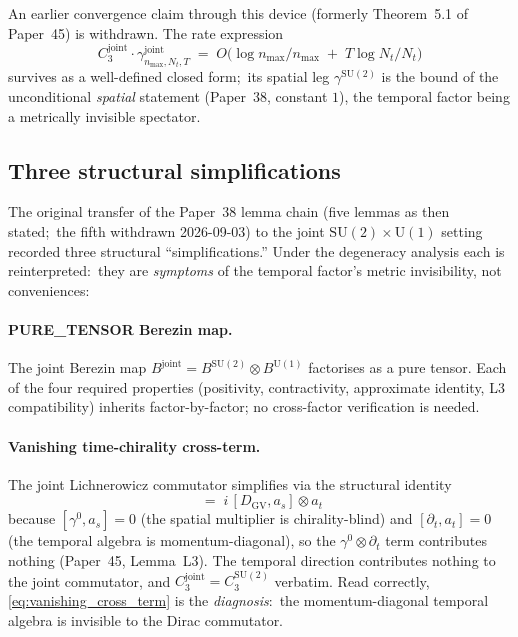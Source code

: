 \documentclass[11pt,a4paper]{article}
\theoremstyle{plain}
\theoremstyle{definition}
\newcommand{\nmax}{n_{\max}}
\newcommand{\Nt}{N_{t}}
\newcommand{\DGV}{D_{\mathrm{GV}}}
\newcommand{\DL}{D_{L}}
\newcommand{\SU}{\mathrm{SU}}
\newcommand{\Uone}{\mathrm{U}(1)}
\begin{document}
An earlier convergence claim through this device (formerly
Theorem~5.1 of Paper~45) is withdrawn.  The rate expression
\begin{equation}
C_{3}^{\mathrm{joint}} \cdot \gamma^{\mathrm{joint}}_{\nmax,\Nt,T}
\;=\;
O\!\bigl(\log \nmax / \nmax \;+\; T\log\Nt / \Nt\bigr)
\label{eq:p45_rate}
\end{equation}
survives as a well-defined closed form;\ its spatial leg
$\gamma^{\SU(2)}$ is the bound of the unconditional \emph{spatial} statement
(Paper~38, constant $1$), the temporal factor being a metrically invisible
spectator.

\subsection{Three structural simplifications}

The original transfer of the Paper~38 lemma chain (five lemmas as then
stated;\ the fifth withdrawn 2026-09-03) to the
joint $\SU(2) \times \Uone$ setting recorded three structural
``simplifications.''  Under the degeneracy analysis each is
reinterpreted:\ they are \emph{symptoms} of the temporal factor's
metric invisibility, not conveniences:

\paragraph{PURE\_TENSOR Berezin map.}  The joint Berezin map
$B^{\mathrm{joint}} = B^{\SU(2)} \otimes B^{\Uone}$ factorises as a
pure tensor.  Each of the four required properties (positivity,
contractivity, approximate identity, L3 compatibility) inherits
factor-by-factor; no cross-factor verification is needed.

\paragraph{Vanishing time-chirality cross-term.}  The joint
Lichnerowicz commutator simplifies via the structural identity
\begin{equation}
[\DL,\, a_{s} \otimes a_{t}]
\;=\;
i\,[\DGV, a_{s}] \otimes a_{t}
\label{eq:vanishing_cross_term}
\end{equation}
because $[\gamma^{0}, a_{s}] = 0$ (the spatial multiplier is
chirality-blind) and $[\partial_{t}, a_{t}] = 0$ (the temporal algebra is
momentum-diagonal), so the $\gamma^{0} \otimes \partial_{t}$ term
contributes nothing (Paper~45, Lemma~L3).  The temporal direction contributes nothing to the joint
commutator, and $C_{3}^{\mathrm{joint}} = C_{3}^{\SU(2)}$ verbatim.
Read correctly, \eqref{eq:vanishing_cross_term} is the
\emph{diagnosis}:\ the momentum-diagonal temporal algebra is
invisible to the Dirac commutator.
\end{document}

